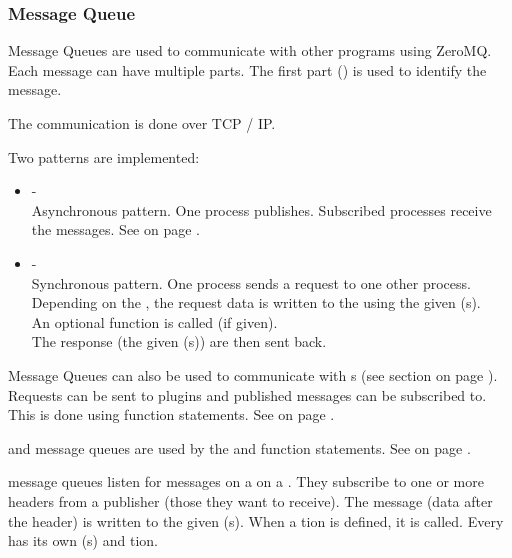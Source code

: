\subsubsection{Message Queue}
\label{sec:opmessagequeue}
Message Queues are used to communicate with other programs using ZeroMQ.
Each message can have multiple parts. The first part (\HEADER)
is used to identify the message.

The communication is done over TCP / IP.

Two patterns are implemented:
\begin{itemize}
\item \PUBLISH{} - \SUBSCRIBE{} \\
Asynchronous pattern. One process publishes. Subscribed processes receive the messages.
See 
on page \pageref{sec:opexamples:messagequeue:publishsubscribe}. \\[2ex]

\item \REQUEST{} - \REPLY{}\\
Synchronous pattern. One process sends a request to one other process.
Depending on the \HEADER, the request data is written to the \DATAPOOL{} using the given
\STREAM(s). \\
An optional function is called (if given). \\
The response (the given \RESPONSE{} \STREAM(s)) are then sent back. \\[2ex]
\end{itemize}

Message Queues can also be used to communicate with \PLUGIN s
(see section  on page \pageref{sec:uiplugin}).
Requests can be sent to plugins and published messages can be subscribed to.
This is done using function statements.
See  on page \pageref{dia:messagequeuestatement}.

\PUBLISH{} and \REQUEST{} message queues are used by the \PUBLISH{} and \REQUEST{} function statements.
See  on page \pageref{dia:messagequeuestatement}.

\SUBSCRIBE{} message queues listen for messages on a \PORT{} on a \HOST{}.
They subscribe to one or more headers from a publisher (those they want to receive).
The message (data after the header) is written to the given \STREAM(s).
When a \FUNC tion is defined, it is called.
Every \HEADER{} has its own \STREAM (s) and \FUNC tion.

